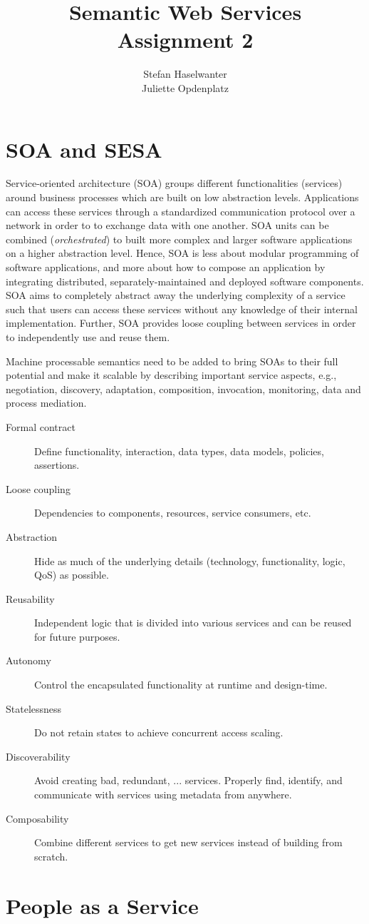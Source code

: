 \documentclass[a4paper]{article}
\title{\textbf{Semantic Web Services}\\\large{Assignment 2}}
\author{Stefan Haselwanter\\Juliette Opdenplatz}
\begin{document}
\maketitle


\section{SOA and SESA}
Service-oriented architecture (SOA) groups different functionalities (services) around business processes which are built on low abstraction levels.
Applications can access these services through a standardized communication protocol over a network in order to to exchange data with one another.
SOA units can be combined (\emph{orchestrated}) to built more complex and larger software applications on a higher abstraction level.
Hence, SOA is less about modular programming of software applications, and more about how to compose an application by integrating distributed, separately-maintained and deployed software components.
SOA aims to completely abstract away the underlying complexity of a service such that users can access these services without any knowledge of their internal implementation.
Further, SOA provides loose coupling between services in order to independently use and reuse them.

Machine processable semantics need to be added to bring SOAs to their full potential and make it scalable by describing important service aspects,
e.g., negotiation, discovery, adaptation, composition, invocation, monitoring, data and process mediation.

\begin{description}
  \item[Formal contract] Define functionality, interaction, data types, data models, policies, assertions.
  \item[Loose coupling] Dependencies to components, resources, service consumers, etc.
  \item[Abstraction] Hide as much of the underlying details (technology, functionality, logic, QoS) as possible.
  \item[Reusability] Independent logic that is divided into various services and can be reused for future purposes.
  \item[Autonomy] Control the encapsulated functionality at runtime and design-time.
  \item[Statelessness] Do not retain states to achieve concurrent access scaling.
  \item[Discoverability] Avoid creating bad, redundant, ... services.
  Properly find, identify, and communicate with services using metadata from anywhere.
  \item[Composability] Combine different services to get new services instead of building from scratch.
\end{description}

\section{People as a Service}
\end{document}
